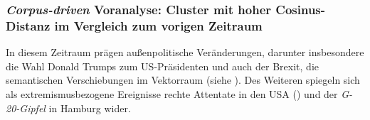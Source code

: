 \subsubsection{\texorpdfstring{\emph{Corpus-driven} Voranalyse: Cluster mit hoher Cosinus-Distanz im Vergleich zum vorigen Zeitraum}{Corpus-driven Voranalyse: Cluster mit hoher Cosinus-Distanz im Vergleich zum vorigen Zeitraum}}\label{corpus-driven-voranalyse-cluster-mit-hoher-cosinus-distanz-im-vergleich-zum-vorigen-zeitraum-5}

In diesem Zeitraum prägen außenpolitische Veränderungen, darunter insbesondere die Wahl Donald Trumps zum US-Präsidenten und auch der Brexit, die semantischen Verschiebungen im Vektorraum (siehe ). Des Weiteren spiegeln sich als extremismusbezogene Ereignisse rechte Attentate in den USA () und der \emph{G-20-Gipfel} in Hamburg wider.

